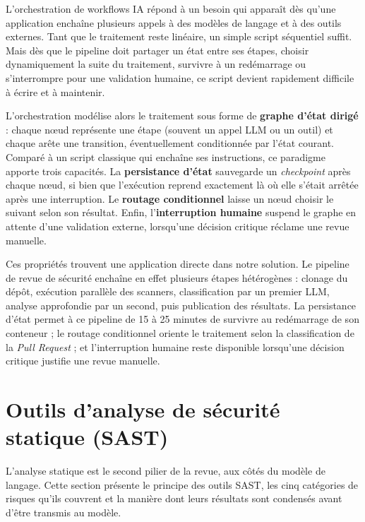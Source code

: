     L'orchestration de workflows IA répond à un besoin qui apparaît dès qu'une application
    enchaîne plusieurs appels à des modèles de langage et à des outils externes. Tant que
    le traitement reste linéaire, un simple script séquentiel suffit. Mais dès que le
    pipeline doit partager un état entre ses étapes, choisir dynamiquement la suite du
    traitement, survivre à un redémarrage ou s'interrompre pour une validation humaine, ce
    script devient rapidement difficile à écrire et à maintenir.

    L'orchestration modélise alors le traitement sous forme de \textbf{graphe d'état
    dirigé} \cite{LangGraph} : chaque nœud représente une étape (souvent un appel LLM ou
    un outil) et chaque arête une transition, éventuellement conditionnée par l'état
    courant. Comparé à un
    script classique qui enchaîne ses instructions, ce paradigme apporte trois capacités.
    La \textbf{persistance d'état} sauvegarde un \textit{checkpoint} après chaque nœud, si
    bien que l'exécution reprend exactement là où elle s'était arrêtée après une
    interruption. Le \textbf{routage conditionnel} laisse un nœud choisir le suivant selon
    son résultat. Enfin, l'\textbf{interruption humaine} suspend le graphe en attente d'une
    validation externe, lorsqu'une décision critique réclame une revue manuelle.

    Ces propriétés trouvent une application directe dans notre solution. Le pipeline de
    revue de sécurité enchaîne en effet plusieurs étapes hétérogènes : clonage du dépôt,
    exécution parallèle des scanners, classification par un premier LLM, analyse
    approfondie par un second, puis publication des résultats. La persistance d'état
    permet à ce pipeline de 15 à 25 minutes de survivre au redémarrage de son conteneur ;
    le routage conditionnel oriente le traitement selon la classification de la
    \textit{Pull Request} ; et l'interruption humaine reste disponible lorsqu'une décision
    critique justifie une revue manuelle.

\section{Outils d'analyse de sécurité statique (SAST)}

    L'analyse statique est le second pilier de la revue, aux côtés du modèle de langage.
    Cette section présente le principe des outils SAST, les cinq catégories de risques
    qu'ils couvrent et la manière dont leurs résultats sont condensés avant d'être transmis
    au modèle.

